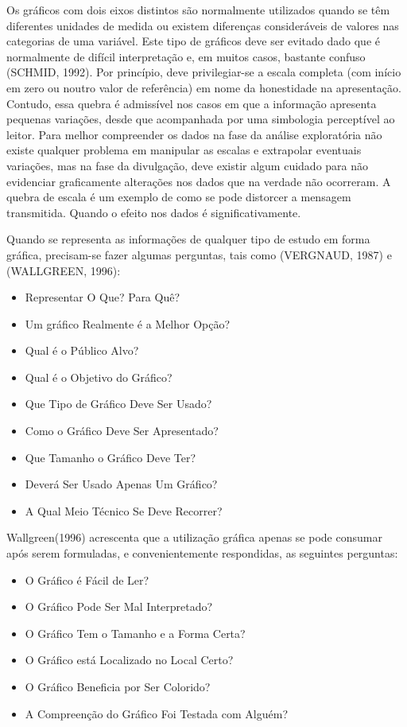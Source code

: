 \begin{itemize}
Os gráficos com dois eixos distintos são normalmente utilizados quando se têm diferentes unidades de medida ou existem diferenças consideráveis de valores nas categorias de uma variável. Este tipo de gráficos deve ser evitado dado que é normalmente de difícil interpretação e, em muitos casos, bastante confuso (SCHMID, 1992). Por princípio, deve privilegiar-se a escala completa (com início em zero ou noutro valor de referência) em nome da honestidade na apresentação. Contudo, essa quebra é admissível nos casos em que a informação apresenta pequenas variações, desde que acompanhada por uma simbologia perceptível ao leitor. Para melhor compreender os dados na fase da análise exploratória não existe qualquer problema em manipular as escalas e extrapolar eventuais variações, mas na fase da divulgação, deve existir algum cuidado para não evidenciar graficamente alterações nos dados que na verdade não ocorreram. A quebra de escala é um exemplo de como se pode distorcer a mensagem transmitida. Quando o efeito nos dados é significativamente. 
\end{itemize}

Quando se representa as informações de qualquer tipo de estudo em forma gráfica, precisam-se fazer algumas perguntas, tais como (VERGNAUD, 1987) e (WALLGREEN, 1996):

\begin{itemize}
\item Representar O Que? Para Quê?
\item Um gráfico Realmente é a Melhor Opção?
\item Qual é o Público Alvo?
\item Qual é o Objetivo do Gráfico?
\item Que Tipo de Gráfico Deve Ser Usado?
\item Como o Gráfico Deve Ser Apresentado?
\item Que Tamanho o Gráfico Deve Ter?
\item Deverá Ser Usado Apenas Um Gráfico?
\item A Qual Meio Técnico Se Deve Recorrer?
\end{itemize}

Wallgreen(1996) acrescenta que a utilização gráfica apenas se pode consumar após serem formuladas, e convenientemente respondidas, as seguintes perguntas:

\begin{itemize}
\item O Gráfico é Fácil de Ler? 
\item O Gráfico Pode Ser Mal Interpretado? 
\item O Gráfico Tem o Tamanho e a Forma Certa? 
\item O Gráfico está Localizado no Local Certo? 
\item O Gráfico Beneficia por Ser Colorido? 
\item A Compreenção do Gráfico Foi Testada com Alguém?
\end{itemize}



